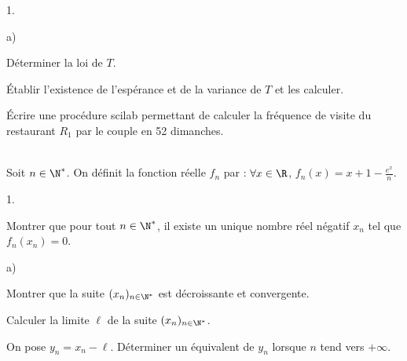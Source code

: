 \documentclass[11pt]{article}%
\begin{document}
\begin{exerciceAP}
\begin{noliste}{1.}
    \begin{noliste}{a)}
    \setlength{\itemsep}{2mm}
    \item Déterminer la loi de $T$.
    \item Établir l'existence de l'espérance et de la variance de $T$
      et les calculer.
    \end{noliste}

  \item Écrire une procédure scilab permettant de calculer la
    fréquence de visite du restaurant $R_1$ par le couple en 52
    dimanches.
  \end{noliste}
\end{exerciceAP}


\begin{exerciceSP}~\\
  Soit $n \in \N^*$. On définit la fonction réelle $f_n$ par :
  $\forall x \in \R$, $f_n (x) = x + 1 - \frac{ e^x }{ n }$.
  \begin{noliste}{1.}
    \setlength{\itemsep}{2mm}
  \item Montrer que pour tout $n \in \N^*$, il existe un unique nombre
    réel négatif $x_n$ tel que $f_n ( x_n ) = 0$.
  \item 
    \begin{noliste}{a)}
    \setlength{\itemsep}{2mm}
    \item Montrer que la suite $(x_n)_{ n \in \N^* }$ est décroissante
      et convergente.
    \item Calculer la limite $\ell$ de la suite $(x_n)_{ n \in \N^* }$.
    \end{noliste}
  \item On pose $y_n = x_n - \ell$. Déterminer un équivalent de $y_n$
    lorsque $n$ tend vers $+\infty$.
  \end{noliste}
\end{exerciceSP}




\end{document}
